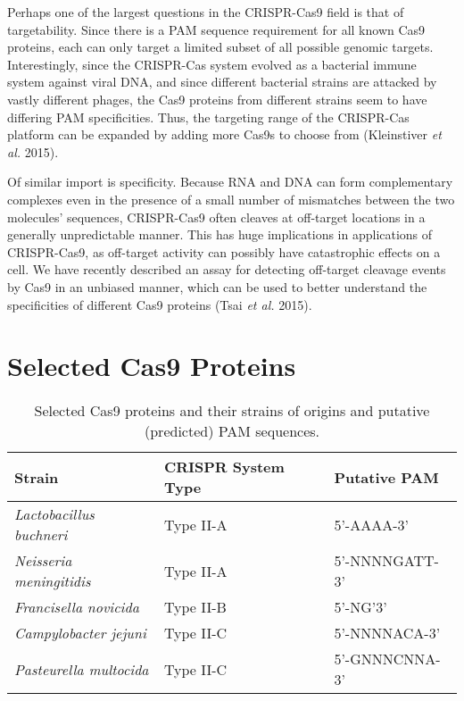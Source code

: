 Perhaps one of the largest questions in the CRISPR-Cas9 field is that of targetability. Since there is a PAM sequence requirement for all known Cas9 proteins, each can only target a limited subset of all possible genomic targets. Interestingly, since the CRISPR-Cas system evolved as a bacterial immune system against viral DNA, and since different bacterial strains are attacked by vastly different phages, the Cas9 proteins from different strains seem to have differing PAM specificities. Thus, the targeting range of the CRISPR-Cas platform can be expanded by adding more Cas9s to choose from (Kleinstiver \textit{et al.} 2015).

Of similar import is specificity. Because RNA and DNA can form complementary complexes even in the presence of a small number of mismatches between the two molecules' sequences, CRISPR-Cas9 often cleaves at off-target locations in a generally unpredictable manner. This has huge implications in applications of CRISPR-Cas9, as off-target activity can possibly have catastrophic effects on a cell. We have recently described an assay for detecting off-target cleavage events by Cas9 in an unbiased manner, which can be used to better understand the specificities of different Cas9 proteins (Tsai \textit{et al.} 2015).


\newpage

\section{Selected Cas9 Proteins}

\begin{table}[h!]
\centering
\label{my-label}
\begin{tabular}{|l|l|l|}
\hline
{\bf Strain}                                        & {\bf CRISPR System Type} & {\bf Putative PAM} \\ \hline
{\it Lactobacillus buchneri}                   & Type II-A                & 5'-AAAA-3'         \\ \hline
{\it Neisseria meningitidis}                & Type II-A                & 5'-NNNNGATT-3'     \\ \hline
{\it Francisella novicida}                     & Type II-B                & 5'-NG'3'           \\ \hline
{\it Campylobacter jejuni}                          & Type II-C                & 5'-NNNNACA-3'      \\ \hline
{\it Pasteurella multocida} & Type II-C                & 5'-GNNNCNNA-3'     \\ \hline
\end{tabular}
\caption{Selected Cas9 proteins and their strains of origins and putative (predicted) PAM sequences.}
\end{table}

